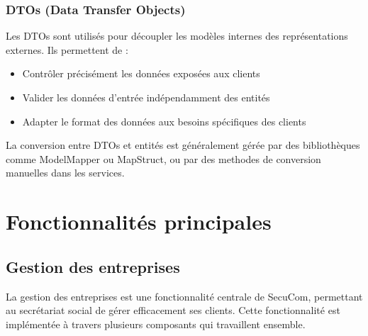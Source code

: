 \subsubsection{DTOs (Data Transfer Objects)}

Les DTOs sont utilisés pour découpler les modèles internes des représentations externes. Ils permettent de :
\begin{itemize}[leftmargin=*,label=\textcolor{darkgray}{$\bullet$},itemsep=0.3em]
  \item Contrôler précisément les données exposées aux clients
  \item Valider les données d'entrée indépendamment des entités
  \item Adapter le format des données aux besoins spécifiques des clients
\end{itemize}

\vspace{0.5cm}

La conversion entre DTOs et entités est généralement gérée par des bibliothèques comme ModelMapper ou MapStruct, ou par des methodes de conversion manuelles dans les services.

\section{Fonctionnalités principales}

\subsection{Gestion des entreprises}

La gestion des entreprises est une fonctionnalité centrale de SecuCom, permettant au secrétariat social de gérer efficacement ses clients. Cette fonctionnalité est implémentée à travers plusieurs composants qui travaillent ensemble.

\vspace{0.5cm}

